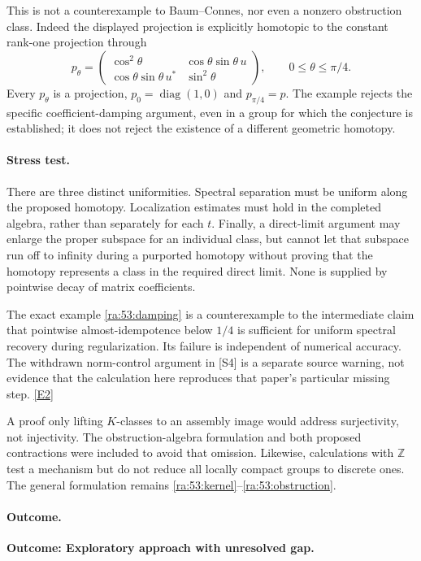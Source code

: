 \documentclass[11pt]{article}
\newcommand{\Z}{\mathbb{Z}}
\newcommand{\eref}[2]{\hyperlink{extra:#1:#2}{[E#2]}}
\begin{document}
This is not a counterexample to Baum--Connes, nor even a nonzero
obstruction class. Indeed the displayed projection is explicitly
homotopic to the constant rank-one projection through
\[
 p_\theta=
 \begin{pmatrix}
 \cos^2\theta&\cos\theta\sin\theta\,u\\
 \cos\theta\sin\theta\,u^*&\sin^2\theta
 \end{pmatrix},\qquad 0\le\theta\le\pi/4.
\]
Every $p_\theta$ is a projection, $p_0=\operatorname{diag}(1,0)$ and
$p_{\pi/4}=p$. The example rejects the specific coefficient-damping
argument, even in a group for which the conjecture is established; it
does not reject the existence of a different geometric homotopy.

\paragraph{Stress test.}
There are three distinct uniformities. Spectral separation must be
uniform along the proposed homotopy. Localization estimates must hold
in the completed algebra, rather than separately for each $t$. Finally,
a direct-limit argument may enlarge the proper subspace for an individual
class, but cannot let that subspace run off to infinity during a purported
homotopy without proving that the homotopy represents a class in the
required direct limit. None is supplied by pointwise decay of matrix
coefficients.

The exact example \eqref{ra:53:damping} is a counterexample to the
intermediate claim that pointwise almost-idempotence below $1/4$ is
sufficient for uniform spectral recovery during regularization. Its
failure is independent of numerical accuracy. The withdrawn norm-control
argument in [S4] is a separate source warning, not evidence that the
calculation here reproduces that paper's particular missing step.
\eref{53}{2}

A proof only lifting $K$-classes to an assembly image would address
surjectivity, not injectivity. The obstruction-algebra formulation and
both proposed contractions were included to avoid that omission.
Likewise, calculations with $\Z$ test a mechanism but do not reduce all
locally compact groups to discrete ones. The general formulation remains
\eqref{ra:53:kernel}--\eqref{ra:53:obstruction}.

\paragraph{Outcome.}
\textbf{Outcome: Exploratory approach with unresolved gap.}
\end{document}
